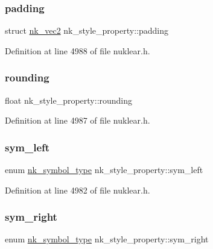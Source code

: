 \subsubsection{\texorpdfstring{padding}{padding}}
{\footnotesize\ttfamily struct \mbox{\hyperlink{structnk__vec2}{nk\+\_\+vec2}} nk\+\_\+style\+\_\+property\+::padding}



Definition at line 4988 of file nuklear.\+h.

\mbox{\label{structnk__style__property_a8fa5d9ee8755ae85850fa92177aaf10c}} 
\subsubsection{\texorpdfstring{rounding}{rounding}}
{\footnotesize\ttfamily float nk\+\_\+style\+\_\+property\+::rounding}



Definition at line 4987 of file nuklear.\+h.

\mbox{\label{structnk__style__property_a1a3b31adbf1e81c87cc4151a8b310bd1}} 
\subsubsection{\texorpdfstring{sym\+\_\+left}{sym\_left}}
{\footnotesize\ttfamily enum \mbox{\hyperlink{nuklear_8h_a29b4aaa400d0ce28aea3c8c9c372ac07}{nk\+\_\+symbol\+\_\+type}} nk\+\_\+style\+\_\+property\+::sym\+\_\+left}



Definition at line 4982 of file nuklear.\+h.

\mbox{\label{structnk__style__property_a5b4fe5f11ee366d111fab105a0961034}} 
\subsubsection{\texorpdfstring{sym\+\_\+right}{sym\_right}}
{\footnotesize\ttfamily enum \mbox{\hyperlink{nuklear_8h_a29b4aaa400d0ce28aea3c8c9c372ac07}{nk\+\_\+symbol\+\_\+type}} nk\+\_\+style\+\_\+property\+::sym\+\_\+right}



